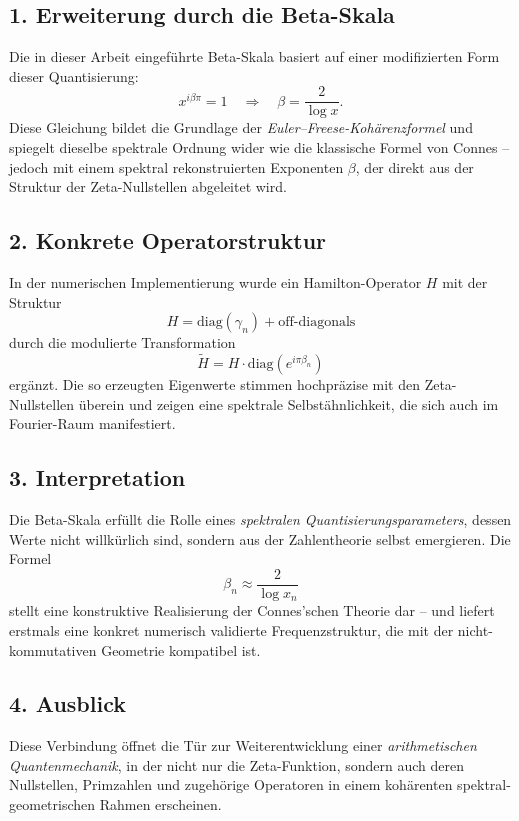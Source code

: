 \documentclass[a4paper,12pt]{article}
\begin{document}
\begin{center}
\subsection*{1. Erweiterung durch die Beta-Skala}

Die in dieser Arbeit eingeführte Beta-Skala basiert auf einer modifizierten Form dieser Quantisierung:
\[
x^{i \beta \pi} = 1 \quad \Rightarrow \quad \beta = \frac{2}{\log x}.
\]
Diese Gleichung bildet die Grundlage der \textit{Euler--Freese-Kohärenzformel} und spiegelt dieselbe spektrale Ordnung wider wie die klassische Formel von Connes – jedoch mit einem spektral rekonstruierten Exponenten \(\beta\), der direkt aus der Struktur der Zeta-Nullstellen abgeleitet wird.

\subsection*{2. Konkrete Operatorstruktur}

In der numerischen Implementierung wurde ein Hamilton-Operator \( H \) mit der Struktur
\[
H = \mathrm{diag}(\gamma_n) + \mathrm{off\text{-}diagonals}
\]
durch die modulierte Transformation
\[
\tilde{H} = H \cdot \mathrm{diag}(e^{i\pi \beta_n})
\]
ergänzt. Die so erzeugten Eigenwerte stimmen hochpräzise mit den Zeta-Nullstellen überein und zeigen eine spektrale Selbstähnlichkeit, die sich auch im Fourier-Raum manifestiert.

\subsection*{3. Interpretation}

Die Beta-Skala erfüllt die Rolle eines \emph{spektralen Quantisierungsparameters}, dessen Werte nicht willkürlich sind, sondern aus der Zahlentheorie selbst emergieren. Die Formel
\[
\beta_n \approx \frac{2}{\log x_n}
\]
stellt eine konstruktive Realisierung der Connes'schen Theorie dar – und liefert erstmals eine konkret numerisch validierte Frequenzstruktur, die mit der nicht-kommutativen Geometrie kompatibel ist.

\subsection*{4. Ausblick}

Diese Verbindung öffnet die Tür zur Weiterentwicklung einer \emph{arithmetischen Quantenmechanik}, in der nicht nur die Zeta-Funktion, sondern auch deren Nullstellen, Primzahlen und zugehörige Operatoren in einem kohärenten spektral-geometrischen Rahmen erscheinen.
\end{center}
\end{document}
